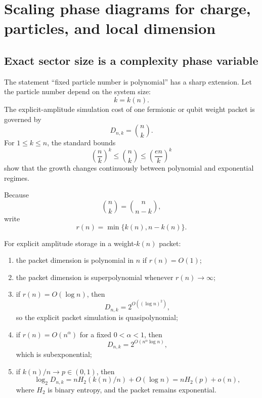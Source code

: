 \chapter{Scaling phase diagrams for charge, particles, and local dimension}
\label{ch:scaling-phases}

\section{Exact sector size is a complexity phase variable}
The statement ``fixed particle number is polynomial'' has a sharp extension. Let the particle number depend on the system size:
\[
k=k(n).
\]
The explicit-amplitude simulation cost of one fermionic or qubit weight packet is governed by
\[
D_{n,k}=\binom nk.
\]
For $1\le k\le n$, the standard bounds
\begin{equation}
\left(\frac nk\right)^k
\le
\binom nk
\le
\left(\frac{en}{k}\right)^k
\label{eq:binomial-basic-bounds}
\end{equation}
show that the growth changes continuously between polynomial and exponential regimes.

Because
\[
\binom nk=\binom n{n-k},
\]
write
\[
r(n)=\min\{k(n),n-k(n)\}.
\]

\begin{theorem}
\label{thm:charge-phase-diagram}
For explicit amplitude storage in a weight-$k(n)$ packet:
\begin{enumerate}
\item the packet dimension is polynomial in $n$ if $r(n)=O(1)$;
\item the packet dimension is superpolynomial whenever $r(n)\to\infty$;
\item if $r(n)=O(\log n)$, then
\[
D_{n,k}=2^{O((\log n)^2)},
\]
so the explicit packet simulation is quasipolynomial;
\item if $r(n)=O(n^\alpha)$ for a fixed $0<\alpha<1$, then
\[
D_{n,k}=2^{O(n^\alpha\log n)},
\]
which is subexponential;
\item if $k(n)/n\to p\in(0,1)$, then
\[
\log_2 D_{n,k}
=
nH_2(k(n)/n)+O(\log n)
=
nH_2(p)+o(n),
\]
where $H_2$ is binary entropy, and the packet remains exponential.
\end{enumerate}
\end{theorem}

